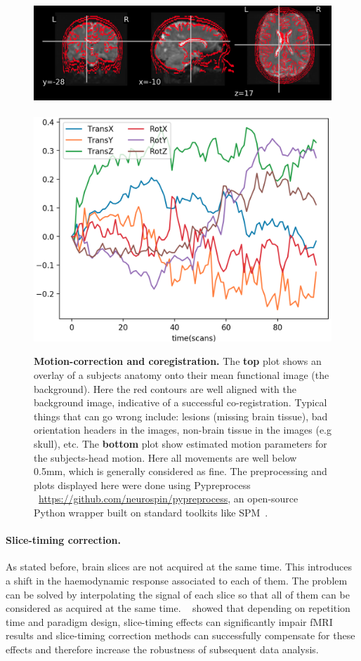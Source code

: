 \begin{figure}[!htpb]
  \includegraphics[width=1\linewidth]{figures/coreg.png}\\\\
  \includegraphics[width=1\linewidth]{figures/mc.png}
  \caption{\textbf{Motion-correction and coregistration.} The \textbf{top} plot shows an overlay of a subjects anatomy onto their mean functional image (the background). Here the red contours are well aligned with the background image, indicative of a successful co-registration. Typical things that can go wrong include: lesions (missing brain tissue), bad orientation headers in the images, non-brain tissue in the images (e.g skull), etc. The \textbf{bottom} plot show estimated motion parameters for the subjects-head motion. Here all movements are well below 0.5mm, which is generally considered as fine. The preprocessing and plots displayed here were done using Pypreprocess ~\url{https://github.com/neurospin/pypreprocess}, an open-source Python wrapper built on standard toolkits like SPM~\citep{friston1994statistical}.}
\end{figure}

\paragraph{Slice-timing correction.}
As stated before, brain slices are not acquired
at the same time. This introduces a shift in the haemodynamic response
associated to each of them. The problem can be solved by interpolating the
signal of each slice so that all of them can be considered as acquired at the
same time. ~\citep{sladky2011} showed that
depending on repetition time and paradigm design, slice-timing effects can significantly impair fMRI results and slice-timing correction methods can successfully compensate for these effects and therefore increase the robustness of subsequent data analysis.

